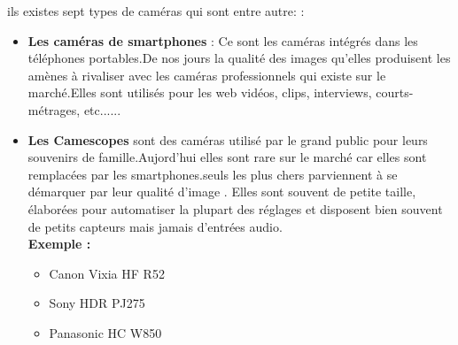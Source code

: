  
ils existes sept types de caméras qui sont entre autre: \cite{noauthor_les_2015} :

\begin{itemize}
	\item \textbf{Les caméras de smartphones} : Ce sont les caméras intégrés dans les téléphones portables.De nos jours la qualité des images qu'elles produisent les amènes à rivaliser avec les caméras professionnels qui existe sur le marché.Elles sont utilisés pour les web vidéos, clips, interviews, courts-métrages, etc......\\
	
	\item \textbf{Les Camescopes} sont des caméras utilisé par le grand public pour leurs souvenirs de famille.Aujord'hui elles sont rare sur le marché car elles sont remplacées par les smartphones.seuls les plus chers parviennent à se démarquer par leur qualité d’image . Elles sont souvent de petite taille, élaborées pour automatiser la plupart des réglages et disposent bien souvent de petits capteurs mais jamais d’entrées audio.\\
		\textbf{Exemple :\\}
    	\begin{itemize}
    		\item Canon Vixia HF R52
    		\item Sony HDR PJ275
    		\item Panasonic HC W850
    	\end{itemize}
    	 

\end{itemize}
